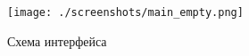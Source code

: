 \begin{figure}[h!]
    \centering
    \texttt{[image: ./screenshots/main\_empty.png]}
    \caption{Схема интерфейса}
\end{figure}

